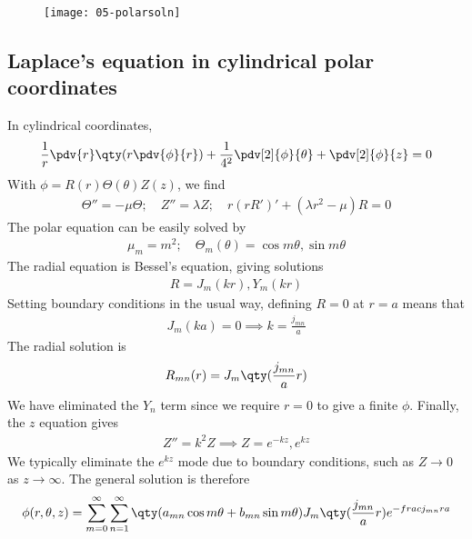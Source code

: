 \begin{figure}[h] 
    \centering 
    \texttt{[image: 05-polarsoln]} 
\end{figure}

\subsection{Laplace's equation in cylindrical polar coordinates}
In cylindrical coordinates,
\begin{align*}
	\frac{1}{r} \pdv{r} \qty(r \pdv{\phi}{r}) + \frac{1}{4^2} \pdv[2]{\phi}{\theta} + \pdv[2]{\phi}{z} = 0
\end{align*}
With $\phi = R(r) \Theta(\theta) Z(z)$, we find
\begin{align*}
	\Theta'' = -\mu \Theta;\quad Z'' = \lambda Z;\quad r(rR')' + (\lambda r^2 - \mu) R = 0
\end{align*}
The polar equation can be easily solved by
\begin{align*}
	\mu_m = m^2;\quad \Theta_m(\theta) = \cos m\theta, \sin m\theta
\end{align*}
The radial equation is Bessel's equation, giving solutions
\begin{align*}
	R = J_m(kr), Y_m(kr)
\end{align*}
Setting boundary conditions in the usual way, defining $R=0$ at $r = a$ means that
\begin{align*}
	J_m(ka) = 0 \implies k = \frac{j_{mn}}{a}
\end{align*}
The radial solution is
\begin{align*}
	R_{mn}(r) = J_m\qty(\frac{j_{mn}}{a}r)
\end{align*}
We have eliminated the $Y_n$ term since we require $r = 0$ to give a finite $\phi$.
Finally, the $z$ equation gives
\begin{align*}
	Z'' = k^2 Z \implies Z = e^{-kz}, e^{kz}
\end{align*}
We typically eliminate the $e^{kz}$ mode due to boundary conditions, such as $Z \to 0$ as $z \to \infty$.
The general solution is therefore
\begin{align*}
	\phi(r,\theta,z) = \sum_{m=0}^\infty \sum_{n = 1}^\infty \qty(a_{mn} \cos m\theta + b_{mn} \sin m\theta) J_m\qty(\frac{j_{mn}}{a} r) e^{-frac{j_{mn}r}{a}}
\end{align*}

